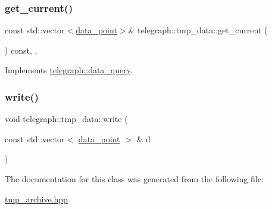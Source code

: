 \subsubsection{\texorpdfstring{get\+\_\+current()}{get\_current()}}
{\footnotesize\ttfamily const std\+::vector$<$\hyperlink{classtelegraph_1_1data__point}{data\+\_\+point}$>$\& telegraph\+::tmp\+\_\+data\+::get\+\_\+current (\begin{DoxyParamCaption}{ }\end{DoxyParamCaption}) const\hspace{0.3cm}{\ttfamily [inline]}, {\ttfamily [override]}, {\ttfamily [virtual]}}



Implements \hyperlink{classtelegraph_1_1data__query_a20545e27166e025df2f73c13907bf721}{telegraph\+::data\+\_\+query}.

\mbox{\label{classtelegraph_1_1tmp__data_a32f7e20afb889b3f9b179cfefed31f9e}} 
\subsubsection{\texorpdfstring{write()}{write()}}
{\footnotesize\ttfamily void telegraph\+::tmp\+\_\+data\+::write (\begin{DoxyParamCaption}\item[{const std\+::vector$<$ \hyperlink{classtelegraph_1_1data__point}{data\+\_\+point} $>$ \&}]{d }\end{DoxyParamCaption})\hspace{0.3cm}{\ttfamily [inline]}}



The documentation for this class was generated from the following file\+:\begin{DoxyCompactItemize}
\item 
\hyperlink{tmp__archive_8hpp}{tmp\+\_\+archive.\+hpp}\end{DoxyCompactItemize}
